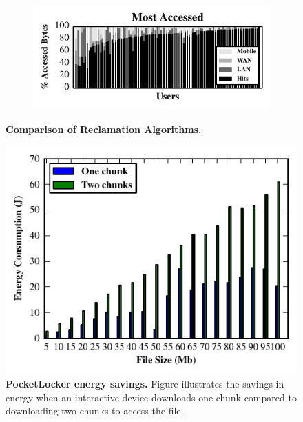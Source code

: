 \begin{figure}[t]
\begin{subfigure}[t]{\columnwidth}
  \end{subfigure}\\
  \begin{subfigure}[t]{\columnwidth}

    \includegraphics{./figures/pocketlocker/AccessSimulatorPerformanceGraph.pdf}

  \end{subfigure}

  \caption{\small \textbf{Comparison of Reclamation Algorithms.}}

  \label{fig-simulation-policy}

\end{figure}

\begin{figure}[t]

  \includegraphics{./figures/energysavings.pdf}

  \caption{\small \textbf{PocketLocker energy savings.} Figure illustrates
    the
    savings in energy when an interactive device downloads one chunk
    compared to
  downloading two chunks to access the file.}

  \label{fig-evaluation-energysavings}

\end{figure}


